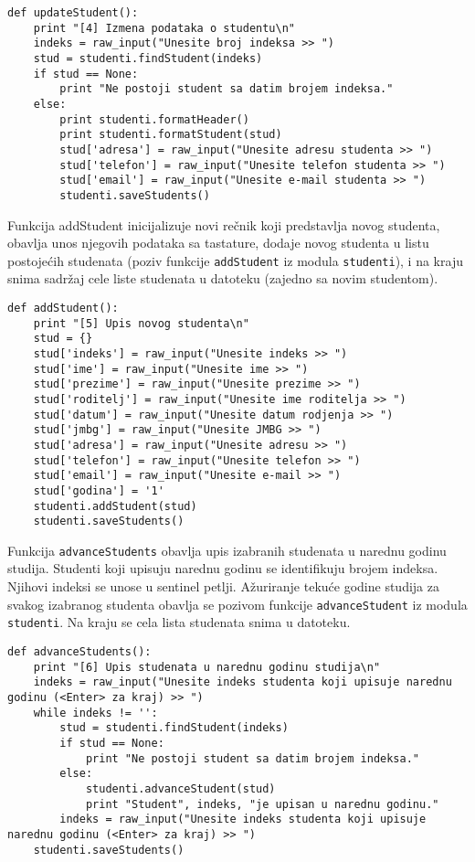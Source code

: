 \documentclass[a4paper]{article}
\begin{document}
\begin{verbatim}
def updateStudent():
    print "[4] Izmena podataka o studentu\n"
    indeks = raw_input("Unesite broj indeksa >> ")
    stud = studenti.findStudent(indeks)
    if stud == None:
        print "Ne postoji student sa datim brojem indeksa."
    else:
        print studenti.formatHeader()
        print studenti.formatStudent(stud)
        stud['adresa'] = raw_input("Unesite adresu studenta >> ")
        stud['telefon'] = raw_input("Unesite telefon studenta >> ")
        stud['email'] = raw_input("Unesite e-mail studenta >> ")
        studenti.saveStudents()
\end{verbatim}

Funkcija addStudent inicijalizuje novi rečnik koji predstavlja novog studenta,
obavlja unos njegovih podataka sa tastature, dodaje novog studenta u listu
postojećih studenata (poziv funkcije \texttt{addStudent} iz modula
\texttt{studenti}), i na kraju snima sadržaj cele liste studenata u datoteku
(zajedno sa novim studentom).

\begin{verbatim}
def addStudent():
    print "[5] Upis novog studenta\n"
    stud = {}
    stud['indeks'] = raw_input("Unesite indeks >> ")
    stud['ime'] = raw_input("Unesite ime >> ")
    stud['prezime'] = raw_input("Unesite prezime >> ")
    stud['roditelj'] = raw_input("Unesite ime roditelja >> ")
    stud['datum'] = raw_input("Unesite datum rodjenja >> ")
    stud['jmbg'] = raw_input("Unesite JMBG >> ")
    stud['adresa'] = raw_input("Unesite adresu >> ")
    stud['telefon'] = raw_input("Unesite telefon >> ")
    stud['email'] = raw_input("Unesite e-mail >> ")
    stud['godina'] = '1'
    studenti.addStudent(stud)
    studenti.saveStudents()
\end{verbatim}

Funkcija \texttt{advanceStudents} obavlja upis izabranih studenata u narednu
godinu studija. Studenti koji upisuju narednu godinu se identifikuju brojem
indeksa. Njihovi indeksi se unose u sentinel petlji. Ažuriranje tekuće godine
studija za svakog izabranog studenta obavlja se pozivom funkcije
\texttt{advanceStudent} iz modula \texttt{studenti}. Na kraju se cela lista
studenata snima u datoteku.

\begin{verbatim}
def advanceStudents():
    print "[6] Upis studenata u narednu godinu studija\n"
    indeks = raw_input("Unesite indeks studenta koji upisuje narednu godinu (<Enter> za kraj) >> ")
    while indeks != '':
        stud = studenti.findStudent(indeks)
        if stud == None:
            print "Ne postoji student sa datim brojem indeksa."
        else:
            studenti.advanceStudent(stud)
            print "Student", indeks, "je upisan u narednu godinu."
        indeks = raw_input("Unesite indeks studenta koji upisuje narednu godinu (<Enter> za kraj) >> ")
    studenti.saveStudents()
\end{verbatim}
\end{document}
